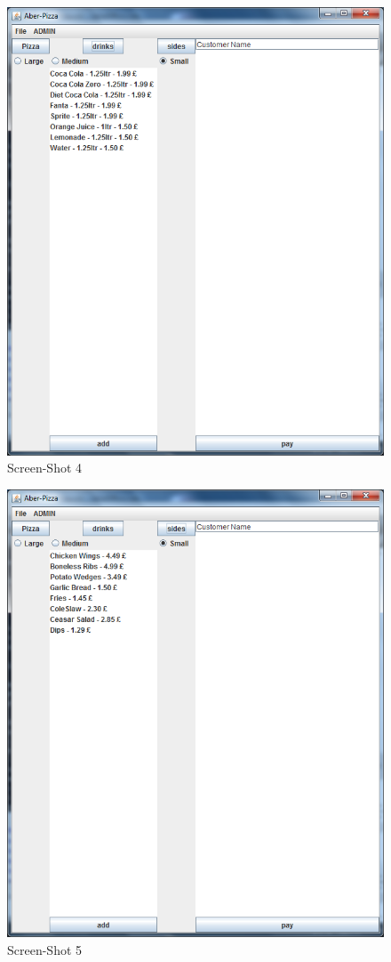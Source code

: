 \documentclass[11pt,a4paper]{article}
\begin{document}
\begin{flushleft}
\begin{figure}[ht]
	\centering
 	\includegraphics[scale = 0.4]{../Sceenshots/Capture3.PNG} 
	\caption{Screen-Shot 4}
\end{figure}

\begin{figure}[ht]
	\centering
 	\includegraphics[scale = 0.4]{../Sceenshots/Capture4.PNG} 
	\caption{Screen-Shot 5}
\end{figure}


\end{flushleft}
\end{document}
